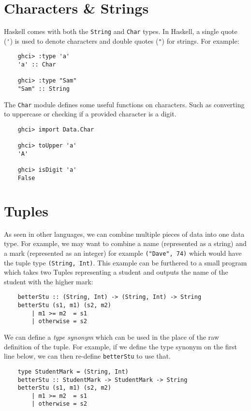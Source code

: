 
\section{Characters \& Strings}
Haskell comes with both the \verb|String| and \verb|Char| types. In Haskell, a single quote (\verb|'|) is used to denote characters and double quotes (\verb|"|) for strings. For example:
\begin{verbatim}
    ghci> :type 'a'
    'a' :: Char

    ghci> :type "Sam"
    "Sam" :: String
\end{verbatim}

The \verb|Char| module defines some useful functions on characters. Such as converting to uppercase or checking if a provided character is a digit.
\begin{verbatim}
    ghci> import Data.Char
    
    ghci> toUpper 'a'
    'A'

    ghci> isDigit 'a'
    False
\end{verbatim}

\section{Tuples}
As seen in other languages, we can combine multiple pieces of data into one data type. For example, we may want to combine a name (represented as a string) and a mark (represented as an integer) for example \verb|("Dave", 74)| which would have the tuple type \verb|(String, Int)|. This example can be furthered to a small program which takes two Tuples representing a student and outputs the name of the student with the higher mark:
\begin{verbatim}
    betterStu :: (String, Int) -> (String, Int) -> String
    betterStu (s1, m1) (s2, m2)
        | m1 >= m2  = s1
        | otherwise = s2
\end{verbatim}

We can define a \textit{type synonym} which can be used in the place of the raw definition of the tuple. For example, if we define the type synonym on the first line below, we can then re-define \verb|betterStu| to use that.
\begin{verbatim}
    type StudentMark = (String, Int)
    betterStu :: StudentMark -> StudentMark -> String
    betterStu (s1, m1) (s2, m2)
        | m1 >= m2  = s1
        | otherwise = s2
\end{verbatim}

